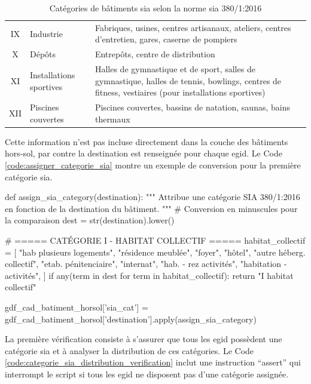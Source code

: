 \begin{table}[H]
\begin{tabular}{@{}clp{}@{}}
    IX & Industrie & Fabriques, usines, centres artisanaux, ateliers, centres d'entretien, gares, caserne de pompiers \\
    X & Dépôts & Entrepôts, centre de distribution \\
    XI & Installations sportives & Halles de gymnastique et de sport, salles de gymnastique, halles de tennis, bowlings, centres de fitness, vestiaires (pour installations sportives) \\
    XII & Piscines couvertes & Piscines couvertes, bassins de natation, saunas, bains thermaux \\
    \bottomrule
    \end{tabular}
    \caption{Catégories de bâtiments \gls{sia} selon la norme \gls{sia} 380/1:2016 \cite{sia_sia-shop_nodate}}
    \label{tab:categories_batiments_sia_380_1}
\end{table}

\newpage
Cette information n'est pas incluse directement dans la couche des bâtiments hors-sol, par contre la destination est renseignée pour chaque \gls{egid}. Le Code \ref{code:assigner_categorie_sia} montre un exemple de conversion pour la première catégorie \gls{sia}.

\begin{code}[H]
    \begin{pythoncode}
    def assign_sia_category(destination):
        """
        Attribue une catégorie SIA 380/1:2016 en fonction de la destination du bâtiment.
        """
        # Conversion en minuscules pour la comparaison
        dest = str(destination).lower()
    
        # ===== CATÉGORIE I - HABITAT COLLECTIF =====
        habitat_collectif = [
            "hab plusieurs logements",
            "résidence meublée",
            "foyer",
            "hôtel",
            "autre héberg. collectif",
            "etab. pénitenciaire",
            "internat",
            "hab. - rez activités",
            "habitation - activités",
        ]
        if any(term in dest for term in habitat_collectif):
            return "I habitat collectif"
    
    gdf_cad_batiment_horsol['sia_cat'] = gdf_cad_batiment_horsol['destination'].apply(assign_sia_category)
    \end{pythoncode}
    \label{code:assigner_categorie_sia}
\end{code}

La première vérification consiste à s'assurer que tous les \gls{egid} possèdent une catégorie \gls{sia} et à analyser la distribution de ces catégories. Le Code \ref{code:categorie_sia_distribution_verification} inclut une instruction ``assert'' qui interrompt le script si tous les \gls{egid} ne disposent pas d'une catégorie assignée.

